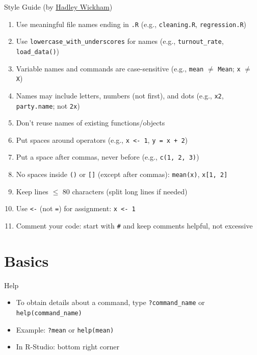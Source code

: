 \documentclass[aspectratio=169]{beamer}
\begin{document}
\begin{frame}{Style Guide (by \href{http://adv-r.had.co.nz/Style.html}{Hadley Wickham})}
\small

\begin{enumerate}
    \item Use meaningful file names ending in \texttt{.R} (e.g., \texttt{cleaning.R}, \texttt{regression.R})\smallskip
    \item Use \texttt{lowercase\_with\_underscores} for names (e.g., \texttt{turnout\_rate}, \texttt{load\_data()})\smallskip
    \item Variable names and commands are case-sensitive (e.g., \texttt{mean} $\neq$ \texttt{Mean}; \texttt{x} $\neq$ \texttt{X})\smallskip
    \item Names may include letters, numbers (not first), and dots (e.g., \texttt{x2}, \texttt{party.name}; not \texttt{2x})\smallskip
    \item Don’t reuse names of existing functions/objects\smallskip
    \item Put spaces around operators (e.g., \texttt{x <- 1}, \texttt{y = x + 2})\smallskip
    \item Put a space after commas, never before (e.g., \texttt{c(1, 2, 3)})\smallskip
    \item No spaces inside \texttt{()} or \texttt{[]} (except after commas): \texttt{mean(x)}, \texttt{x[1, 2]}\smallskip
    \item Keep lines $\le$ 80 characters (split long lines if needed)\smallskip
    \item Use \texttt{<-} (not \texttt{=}) for assignment: \texttt{x <- 1}\smallskip
    \item Comment your code: start with \texttt{\#} and keep comments helpful, not excessive
\end{enumerate}
\end{frame}



\section{\Large Basics}

\begin{frame}{Help}
\begin{itemize}
    \item To obtain details about a command, type \newline
    \texttt{?command\_name} \newline
    or \newline
    \texttt{help(command\_name)}
    \item Example: \texttt{?mean} or \texttt{help(mean)}\smallskip
    \item In R-Studio: bottom right corner \smallskip
\end{itemize}
\end{frame}
\end{document}

